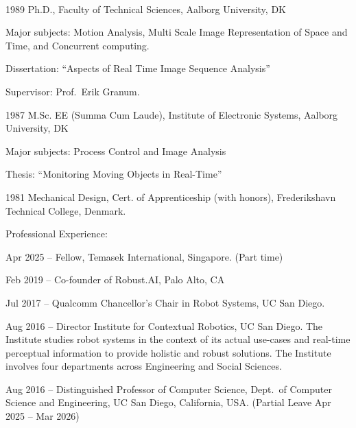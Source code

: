 \documentclass{article}
\newenvironment{sublist}{%
  \begin{list}{}{%
      \setlength{\itemsep}{0em}\setlength{\parsep}{0em}%
      \setlength{\topsep}{0em}\setlength{\parskip}{0em}%
    }%
}%
{ \end{list} }
\begin{document}
\begin{cv}
	\begin{cvlist}{~}
		\item[1989] Ph.D., Faculty of Technical Sciences, Aalborg
		University, DK
		\begin{sublist}
			\item Major subjects: Motion Analysis, Multi Scale Image
			Representation of Space and Time, and Concurrent computing.
			\item Dissertation: ``Aspects of Real Time Image Sequence Analysis''
			\item Supervisor: Prof.\ Erik Granum.
		\end{sublist}
		\item[1987] M.Sc. EE (Summa Cum Laude), Institute of Electronic
		Systems, Aalborg University, DK
		\begin{sublist}
			\item Major subjects: Process Control and Image Analysis
			\item Thesis: ``Monitoring Moving Objects in Real-Time''
		\end{sublist}
		\item[1981] Mechanical Design, Cert.
		of Apprenticeship (with honors), Frederikshavn Technical
		College, Denmark.
	\end{cvlist}



	\begin{cvlist}{Professional Experience:}
		\item[Apr 2025 --] Fellow, Temasek International, Singapore. (Part time)

		\item[Feb 2019 --] Co-founder of Robust.AI, Palo Alto, CA

		\item[Jul 2017 --] Qualcomm Chancellor's Chair in Robot Systems, UC San Diego.

		\item[Aug 2016 --] Director Institute for Contextual Robotics, UC San
		Diego. The Institute studies robot systems in the context of its
		actual use-cases and real-time perceptual information to provide
		holistic and robust solutions. The Institute involves four
		departments across Engineering and Social Sciences.

		\item[Aug 2016 --] Distinguished Professor of Computer Science, Dept.\ of
		Computer Science and Engineering, UC San Diego, California, USA.\@
		(Partial Leave Apr 2025 -- Mar 2026)


\end{cvlist}
\end{cv}
\end{document}

